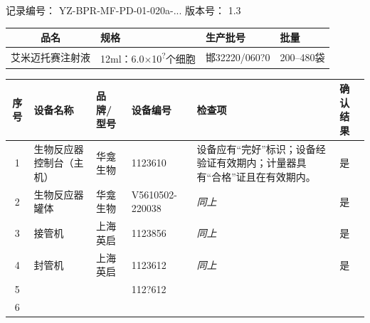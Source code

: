 \documentclass[UTF8,10pt,a4paper,fontset=fandol]{ctexart}
\newcommand{\fieldvalue}[1]{#1}
\newcommand{\handwritten}[1]{#1}
\begin{document}
记录编号：
\fieldvalue{YZ-BPR-MF-PD-01-020a-...}
\hfill
版本号：
\fieldvalue{1.3}

\begin{tabularx}{\textwidth}{|c|X|X|X|}
\hline
品名 & 规格 & 生产批号 & 批量 \\
\hline
\fieldvalue{艾米迈托赛注射液} &
\fieldvalue{12ml：6.0$\times$10\textsuperscript{?}个细胞} &
\fieldvalue{\handwritten{邯32220/060?0}} &
\fieldvalue{200--480袋} \\
\hline
\end{tabularx}

\begin{tabularx}{\textwidth}{|c|X|X|X|X|X|}
\hline
序号 & 设备名称 & 品牌/型号 & 设备编号 & 检查项 & 确认结果 \\
\hline
1 &
\fieldvalue{生物反应器控制台（主机）} &
\fieldvalue{华龛生物} &
\fieldvalue{\handwritten{1123610}} &
设备应有“完好”标识；设备经验证有效期内；计量器具有“合格”证且在有效期内。 &
\fieldvalue{\handwritten{是}} \\
\hline
2 &
\fieldvalue{生物反应器罐体} &
\fieldvalue{华龛生物} &
\fieldvalue{\handwritten{V5610502-220038}} &
\textit{同上} &
\fieldvalue{\handwritten{是}} \\
\hline
3 &
\fieldvalue{接管机} &
\fieldvalue{上海英启} &
\fieldvalue{\handwritten{1123856}} &
\textit{同上} &
\fieldvalue{\handwritten{是}} \\
\hline
4 &
\fieldvalue{封管机} &
\fieldvalue{上海英启} &
\fieldvalue{\handwritten{1123612}} &
\textit{同上} &
\fieldvalue{\handwritten{是}} \\
\hline
5 & & &
\fieldvalue{\handwritten{112?612}} &
& \\
\hline
6 & & & & & \\
\hline
\end{tabularx}
\end{document}
